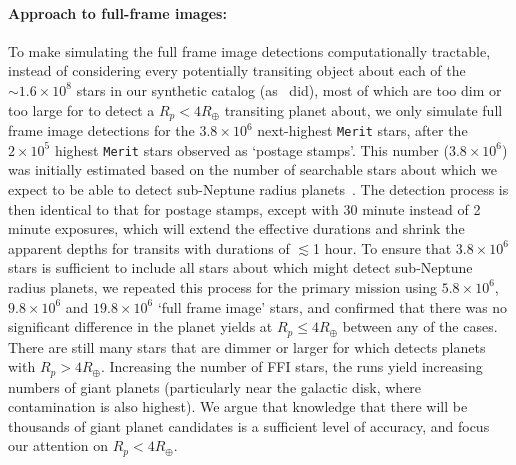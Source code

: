\paragraph{Approach to full-frame images:}
\label{sec:FFI_simulation}
To make simulating the full frame image detections computationally tractable, instead of considering every potentially transiting object about each of the $\sim 1.6\times10^8$ stars in our synthetic catalog (as~ did), most of which are too dim or too large for \tess to detect a $R_p < 4R_\oplus$ transiting planet about, we only simulate full frame image detections for the $3.8\times10^6$ next-highest \texttt{Merit} stars, after the $2\times10^5$ highest \texttt{Merit} stars observed as `postage stamps'.
This number ($3.8\times10^6$) was initially estimated based on the number of searchable stars about which we expect \tess to be able to detect sub-Neptune radius planets~\citep{winn_searchable_2013}.
The detection process is then identical to that for postage stamps, except with 30 minute instead of 2 minute exposures, which will extend the effective durations and shrink the apparent depths for transits with durations of $\lesssim$1 hour.
To ensure that $3.8\times10^6$ stars is sufficient to include all stars about which \tess might detect sub-Neptune radius planets, we repeated this process for the primary mission using $5.8\times10^6$, $9.8\times10^6$ and $19.8\times10^6$ `full frame image' stars, and confirmed that there was no significant difference in the planet yields at $R_p\le4R_\oplus$ between any of the cases. %
There are still many stars that are dimmer or larger for which \tess detects planets with $R_p>4R_\oplus$.
Increasing the number of FFI stars, the runs yield increasing numbers of giant planets (particularly near the galactic disk, where contamination is also highest).
We argue that knowledge that there will be thousands of giant planet candidates is a sufficient level of accuracy, and focus our attention on $R_p<4R_\oplus$.

